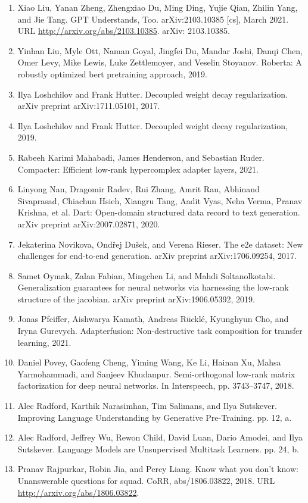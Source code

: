 \documentclass[11pt,UTF8,fontset=fandol]{ctexart}
\begin{document}
\begin{enumerate}[leftmargin=2em,itemsep=2pt]
\item Xiao Liu, Yanan Zheng, Zhengxiao Du, Ming Ding, Yujie Qian, Zhilin Yang, and Jie Tang. GPT Understands, Too. arXiv:2103.10385 [cs], March 2021. URL \url{http://arxiv.org/abs/2103.10385}. arXiv: 2103.10385.
\item Yinhan Liu, Myle Ott, Naman Goyal, Jingfei Du, Mandar Joshi, Danqi Chen, Omer Levy, Mike Lewis, Luke Zettlemoyer, and Veselin Stoyanov. Roberta: A robustly optimized bert pretraining approach, 2019.
\item Ilya Loshchilov and Frank Hutter. Decoupled weight decay regularization. arXiv preprint arXiv:1711.05101, 2017.
\item Ilya Loshchilov and Frank Hutter. Decoupled weight decay regularization, 2019.
\item Rabeeh Karimi Mahabadi, James Henderson, and Sebastian Ruder. Compacter: Efficient low-rank hypercomplex adapter layers, 2021.
\item Linyong Nan, Dragomir Radev, Rui Zhang, Amrit Rau, Abhinand Sivaprasad, Chiachun Hsieh, Xiangru Tang, Aadit Vyas, Neha Verma, Pranav Krishna, et al. Dart: Open-domain structured data record to text generation. arXiv preprint arXiv:2007.02871, 2020.
\item Jekaterina Novikova, Ond\v{r}ej Du\v{s}ek, and Verena Rieser. The e2e dataset: New challenges for end-to-end generation. arXiv preprint arXiv:1706.09254, 2017.
\item Samet Oymak, Zalan Fabian, Mingchen Li, and Mahdi Soltanolkotabi. Generalization guarantees for neural networks via harnessing the low-rank structure of the jacobian. arXiv preprint arXiv:1906.05392, 2019.
\item Jonas Pfeiffer, Aishwarya Kamath, Andreas R\"uckl\'e, Kyunghyun Cho, and Iryna Gurevych. Adapterfusion: Non-destructive task composition for transfer learning, 2021.
\item Daniel Povey, Gaofeng Cheng, Yiming Wang, Ke Li, Hainan Xu, Mahsa Yarmohammadi, and Sanjeev Khudanpur. Semi-orthogonal low-rank matrix factorization for deep neural networks. In Interspeech, pp. 3743--3747, 2018.
\item Alec Radford, Karthik Narasimhan, Tim Salimans, and Ilya Sutskever. Improving Language Understanding by Generative Pre-Training. pp. 12, a.
\item Alec Radford, Jeffrey Wu, Rewon Child, David Luan, Dario Amodei, and Ilya Sutskever. Language Models are Unsupervised Multitask Learners. pp. 24, b.
\item Pranav Rajpurkar, Robin Jia, and Percy Liang. Know what you don't know: Unanswerable questions for squad. CoRR, abs/1806.03822, 2018. URL \url{http://arxiv.org/abs/1806.03822}.

\end{enumerate}
\end{document}
